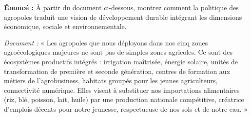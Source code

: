 \documentclass[11pt]{article}
\begin{document}
\begin{exoresolu}
\textbf{Énoncé :} À partir du document ci-dessous, montrez comment la politique des agropoles traduit une vision de développement durable intégrant les dimensions économique, sociale et environnementale.

\textit{Document :} « Les agropoles que nous déployons dans nos cinq zones agroécologiques majeures ne sont pas de simples zones agricoles. Ce sont des écosystèmes productifs intégrés : irrigation maîtrisée, énergie solaire, unités de transformation de première et seconde génération, centres de formation aux métiers de l'agrobusiness, habitats groupés pour les jeunes agriculteurs, connectivité numérique. Elles visent à substituer nos importations alimentaires (riz, blé, poisson, lait, huile) par une production nationale compétitive, créatrice d'emplois décents pour notre jeunesse, respectueuse de nos sols et de notre eau. »


\end{exoresolu}
\end{document}
